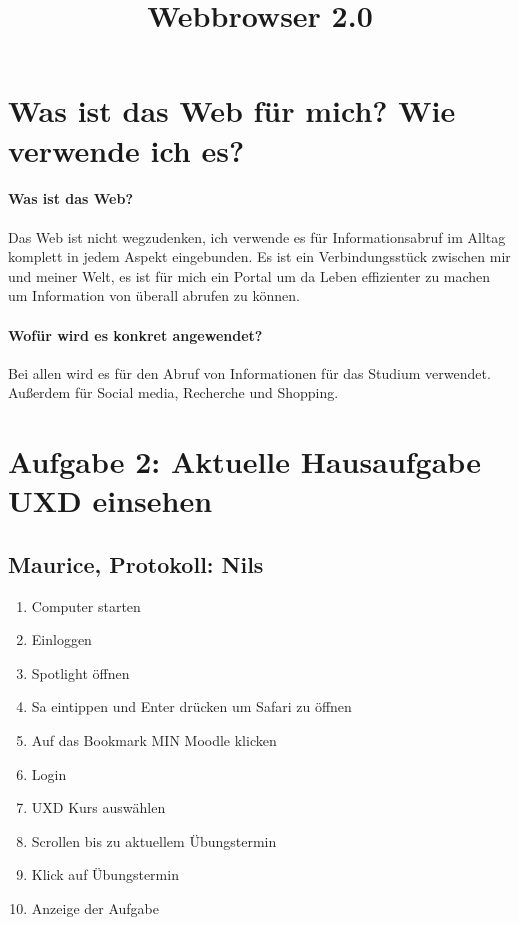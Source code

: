 \documentclass[a4paper,10pt]{article}
\begin{document}
    \kopf

    \title{Webbrowser 2.0}
    \section{Was ist das Web für mich? Wie verwende ich es?}
    \paragraph{Was ist das Web?}
    Das Web ist nicht wegzudenken, ich verwende es für Informationsabruf im Alltag komplett in jedem Aspekt eingebunden.
    Es ist ein Verbindungsstück zwischen mir und meiner Welt, es ist für mich ein Portal um da Leben effizienter zu machen um Information von überall abrufen zu können.
    \paragraph{Wofür wird es konkret angewendet?}
    Bei allen wird es für den Abruf von Informationen für das Studium verwendet.
    Außerdem für Social media, Recherche und Shopping.



    \section{Aufgabe 2: Aktuelle Hausaufgabe UXD einsehen}
    \subsection{Maurice, Protokoll: Nils}
    \begin{enumerate}
        \item Computer starten
        \item Einloggen
        \item Spotlight öffnen
        \item \glqq Sa\grqq{} eintippen und Enter drücken um Safari zu öffnen
        \item Auf das Bookmark \glqq MIN Moodle\grqq{} klicken
        \item Login
        \item UXD Kurs auswählen
        \item Scrollen bis zu aktuellem Übungstermin
        \item Klick auf Übungstermin
        \item Anzeige der Aufgabe
    \end{enumerate}
\end{document}
